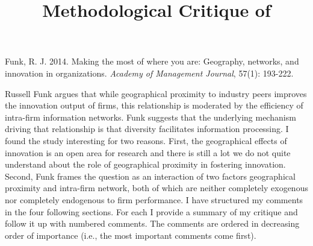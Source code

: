 \documentclass[12pt,letterpaper]{article}
\begin{document}
\title{Methodological Critique of \cite{Funk2014}\vspace{-2cm}}
\date{}
\maketitle

\pagestyle{fancy}
\fancyhf{}
\rhead{\thepage}

Funk, R. J. 2014. Making the most of where you are: Geography, networks, and innovation in organizations. \textit{Academy of Management Journal}, 57(1): 193-222.\vspace{1cm}

Russell Funk argues that while geographical proximity to industry peers improves the innovation output of firms, this relationship is moderated by the efficiency of intra-firm information networks. Funk suggests that the underlying mechanism driving that relationship is that diversity facilitates information processing. I found the study interesting for two reasons. First, the geographical effects of innovation is an open area for research and there is still a lot we do not quite understand about the role of geographical proximity in fostering innovation. Second, Funk frames the question as an interaction of two factors geographical proximity and intra-firm network, both of which are neither completely exogenous nor completely endogenous to firm performance. I have structured my comments in the four following sections. For each I provide a summary of my critique and follow it up with numbered comments. The comments are ordered in decreasing order of importance (i.e., the most important comments come first).
\end{document}
